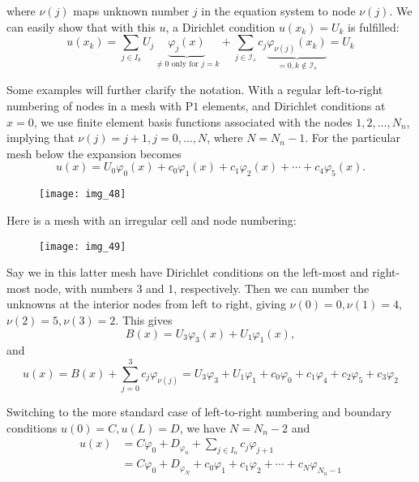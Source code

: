 \documentclass[../main.tex]{subfiles}
\begin{document}
		\noindent where $\nu(j)$ maps unknown number $j$ in the equation system to node $\nu(j)$. We can easily show that with this $u$, a Dirichlet condition $u\left(x_{k}\right)=U_{k}$ is fulfilled:
		$$
		u\left(x_{k}\right)=\sum_{j \in I_{b}} U_{j} \underbrace{\varphi_{j}(x)}_{\neq 0 \text { only for } j=k}+\sum_{j \in \mathcal{I}_{s}} c_{j} \underbrace{\varphi_{\nu(j)}\left(x_{k}\right)}_{=0, k \notin \mathcal{I}_{s}}=U_{k}
		$$
		
		Some examples will further clarify the notation. With a regular left-to-right numbering of nodes in a mesh with $\mathrm{P} 1$ elements, and Dirichlet conditions at $x=0$, we use finite element basis functions associated with the nodes $1,2, \ldots, N_{n}$, implying that $\nu(j)=j+1, j=0, \ldots, N$, where $N=N_{n}-1$. For the particular mesh below the expansion becomes
		$$
		u(x)=U_{0} \varphi_{0}(x)+c_{0} \varphi_{1}(x)+c_{1} \varphi_{2}(x)+\cdots+c_{4} \varphi_{5}(x) .
		$$
		
		\begin{figure}[H]
			\centering
			\texttt{[image: img\_48]}
			\label{figi:img_48}
		\end{figure}
	
		Here is a mesh with an irregular cell and node numbering:
		
		\begin{figure}[H]
			\centering
			\texttt{[image: img\_49]}
			\label{figi:img_49}
		\end{figure}
	
		Say we in this latter mesh have Dirichlet conditions on the left-most and right-most node, with numbers 3 and 1, respectively. Then we can number the unknowns at the interior nodes from left to right, giving $\nu(0)=0, \nu(1)=4$, $\nu(2)=5, \nu(3)=2$. This gives
		$$
		B(x)=U_{3} \varphi_{3}(x)+U_{1} \varphi_{1}(x),
		$$
		and
		$$
		u(x)=B(x)+\sum_{j=0}^{3} c_{j} \varphi_{\nu(j)}=U_{3} \varphi_{3}+U_{1} \varphi_{1}+c_{0} \varphi_{0}+c_{1} \varphi_{4}+c_{2} \varphi_{5}+c_{3} \varphi_{2}
		$$
		
		Switching to the more standard case of left-to-right numbering and boundary conditions $u(0)=C, u(L)=D$, we have $N=N_{n}-2$ and
		$$
		\begin{aligned}
			u(x) &=C \varphi_{0}+D_{\varphi_{n}}+\sum_{j \in I_{n}} c_{j} \varphi_{j+1} \\
			&=C \varphi_{0}+D_{\varphi_{N}}+c_{0} \varphi_{1}+c_{1} \varphi_{2}+\cdots+c_{N} \varphi_{N_{n}-1}
		\end{aligned}
		$$
		
\end{document}
